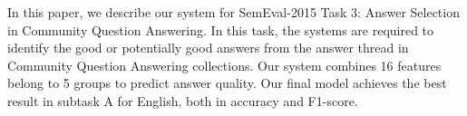 In this paper, we describe our system for SemEval-2015 Task 3: Answer Selection in Community Question Answering. In this task, the systems are required to identify the good or potentially good answers from the answer thread in Community Question Answering collections. Our system combines 16 features belong to 5 groups to predict answer quality. Our final model achieves the best result in subtask A for English, both in accuracy and F1-score.
